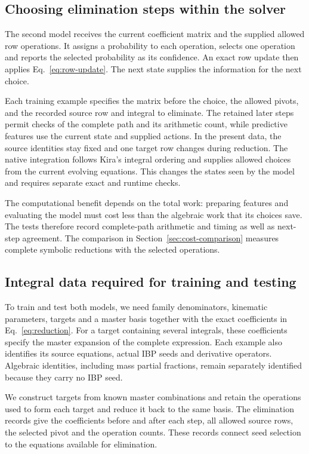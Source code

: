 \documentclass[11pt,a4paper]{article}
\begin{document}
\subsection{Choosing elimination steps within the solver}
The second model receives the current coefficient matrix and the
supplied allowed row operations. It assigns a probability to each
operation, selects one operation and reports the selected
probability as its confidence. An exact row update then applies
Eq.~\eqref{eq:row-update}. The next state supplies the information
for the next choice.

Each training example specifies the matrix before the choice, the
allowed pivots, and the recorded source row and integral to eliminate.
The retained later steps permit checks of the complete path and its
arithmetic count, while predictive features use the current state
and supplied actions. In the present data, the source identities stay
fixed and one target row changes during reduction. The native
integration follows Kira's integral ordering and supplies allowed
choices from the current evolving equations. This changes the states
seen by the model and requires separate exact and runtime checks.

The computational benefit depends on the total work: preparing
features and evaluating the model must cost less than the algebraic
work that its choices save. The tests therefore record complete-path
arithmetic and timing as well as next-step agreement. The comparison in Section~\ref{sec:cost-comparison} measures
complete symbolic reductions with the selected operations.

\subsection{Integral data required for training and testing}
To train and test both models, we need family denominators, kinematic
parameters, targets and a master basis together with the exact
coefficients in Eq.~\eqref{eq:reduction}. For a target containing
several integrals, these coefficients specify the master expansion
of the complete expression. Each example also identifies its source
equations, actual IBP seeds and derivative operators. Algebraic
identities, including mass partial fractions, remain separately
identified because they carry no IBP seed.

We construct targets from known master combinations and retain the
operations used to form each target and reduce it back to the same
basis. The elimination records give the coefficients before and after
each step, all allowed source rows, the selected pivot and the
operation counts. These records connect seed selection to the
equations available for elimination.
\end{document}
